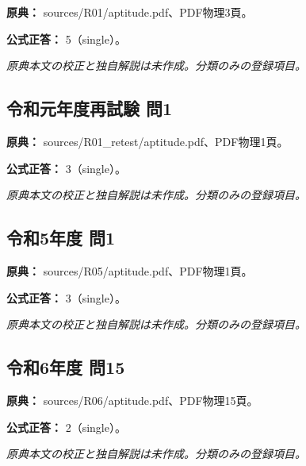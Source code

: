 \noindent\textbf{原典：} sources/R01/aptitude.pdf、PDF物理3頁。

\textbf{公式正答：} 5（single）。

\par\textit{原典本文の校正と独自解説は未作成。分類のみの登録項目。}

\subsection{令和元年度再試験 問1}
\label{q:r01-ret-apt-01}

\noindent\textbf{原典：} sources/R01\_retest/aptitude.pdf、PDF物理1頁。

\textbf{公式正答：} 3（single）。

\par\textit{原典本文の校正と独自解説は未作成。分類のみの登録項目。}

\subsection{令和5年度 問1}
\label{q:r05-reg-apt-01}

\noindent\textbf{原典：} sources/R05/aptitude.pdf、PDF物理1頁。

\textbf{公式正答：} 3（single）。

\par\textit{原典本文の校正と独自解説は未作成。分類のみの登録項目。}

\subsection{令和6年度 問15}
\label{q:r06-reg-apt-15}

\noindent\textbf{原典：} sources/R06/aptitude.pdf、PDF物理15頁。

\textbf{公式正答：} 2（single）。

\par\textit{原典本文の校正と独自解説は未作成。分類のみの登録項目。}
